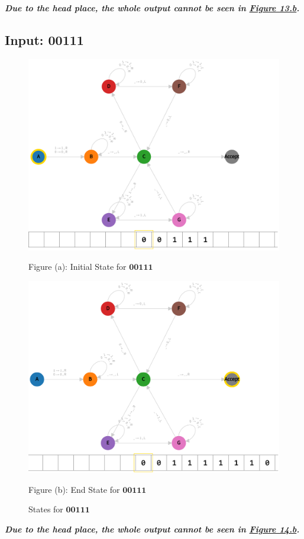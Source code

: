 \begin{center}
\textbf{\textit{Due to the head place, the whole output cannot be seen in \hyperref[fig:1010001-end]{Figure 13.b}.}}
\end{center}

\subsection*{Input: 00111}

\begin{figure}[ht]
  \centering
  \begin{minipage}{.49\linewidth}
    \centering
    \includegraphics[width=\linewidth]{answers/img/q2-00111-initial.png}
    \caption*{Figure (a): Initial State for $\mathbf{00111}$}
    \label{fig:00111-initial}
  \end{minipage}
  \begin{minipage}{.49\linewidth}
    \centering
    \includegraphics[width=\linewidth]{answers/img/q2-00111-end.png}
    \caption*{Figure (b): End State for $\mathbf{00111}$}
    \label{fig:00111-end}
  \end{minipage}
  \caption{States for $\mathbf{00111}$}
  \label{fig:in-00111}
\end{figure}

\begin{center}
\textbf{\textit{Due to the head place, the whole output cannot be seen in \hyperref[fig:00111-end]{Figure 14.b}.}}
\end{center}

\vspace*{\fill}
\newpage
